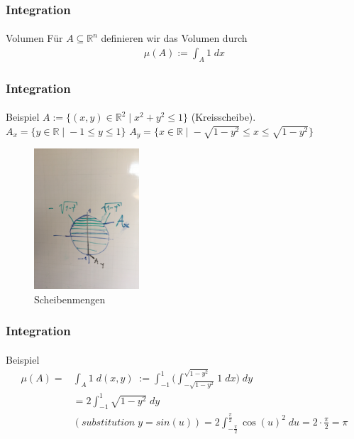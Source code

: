 \documentclass{beamer}
\begin{document}
\begin{frame}
    \frametitle{Integration}
\framesubtitle{}

    \begin{block}{Volumen}
Für $A \subseteq \mathbb{R}^n $  definieren wir das Volumen  durch
\begin{align*}
\mu(A) := \int_A 1  \; dx  
\end{align*}
\end{block}
 \end{frame}


\begin{frame}
    \frametitle{Integration}
\framesubtitle{}

    \begin{block}{Beispiel}
$A:= \{ (x,y) \in \mathbb{R}^2 \;  | \;  x^2 + y^2 \leq 1\}$ (Kreisscheibe). $A_x =  \{ y  \in \mathbb{R} \;  | \; -1 \leq y \leq 1\} $
$A_y =  \{ x  \in \mathbb{R} \;  | \;  -\sqrt{1 - y^2} \leq x \leq \sqrt{1 - y^2} \} $
\end{block}
\begin{figure}[htp]
      \centering
    \includegraphics[width=0.35\textwidth]{img/int}
      \caption{Scheibenmengen}
\end{figure}
 \end{frame}

\begin{frame}
    \frametitle{Integration}
\framesubtitle{}

    \begin{block}{Beispiel}
\begin{align*}
\mu(A) = & \int_A 1  \; d(x,y) \;  := \int_{-1}^{1} \Biggl( \int_{-\sqrt{1 - y^2} }^{\sqrt{1 - y^2} } 1 \;  dx \Biggr) \; dy \\ 
& =  2 \int_{-1}^{1}  \sqrt{1 - y^2}   \; dy  \\ 
 & (substitution \;   y = sin(u)) =   2 \int_{-\frac{\pi}{2}}^{\frac{\pi}{2}}   \cos(u)^2   \; du = 2 \cdot \frac{\pi}{2} = \pi
\end{align*}
\end{block}

 \end{frame}
\end{document}
